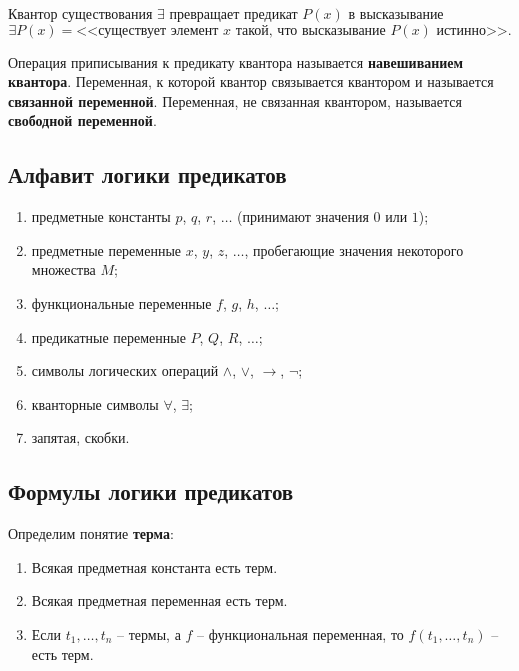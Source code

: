 \documentclass[a5paper, 11pt]{extarticle}
\theoremstyle{definition}
\theoremstyle{definition}
\theoremstyle{definition}
\numberwithin{figure}{section}
\numberwithin{table}{section}
\begin{document}
Квантор существования \(\exists\) превращает предикат \(P(x)\) в высказывание
\[
    \exists P(x) = \text{<<существует элемент \(x\) такой, что высказывание \(P(x)\) истинно>>}.
\]

Операция приписывания к предикату квантора называется \textbf{навешиванием квантора}. Переменная, к которой квантор связывается квантором и называется \textbf{связанной переменной}. Переменная, не связанная квантором, называется \textbf{свободной переменной}.

\subsection{Алфавит логики предикатов}

\begin{enumerate}
    \item предметные константы \(p\), \(q\), \(r\), \(\ldots\) (принимают значения \(0\) или \(1\));
    \item предметные переменные \(x\), \(y\), \(z\), \(\ldots\), пробегающие значения некоторого множества \(M\);
    \item функциональные переменные \(f\), \(g\), \(h\), \(\ldots\);
    \item предикатные переменные \(P\), \(Q\), \(R\), \(\ldots\);
    \item символы логических операций \(\land\), \(\lor\), \(\to\), \(\neg\);
    \item кванторные символы \(\forall\), \(\exists\);
    \item запятая, скобки.
\end{enumerate}

\subsection{Формулы логики предикатов}

\noindent Определим понятие \textbf{терма}:
\begin{enumerate}
    \item Всякая предметная константа есть терм.
    \item Всякая предметная переменная есть терм.
    \item Если \(t_1, \ldots, t_n\) -- термы, а \(f\) -- функциональная переменная, то \(f(t_1, \ldots, t_n)\) -- есть терм.
\end{enumerate}
\end{document}
